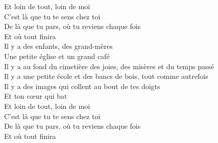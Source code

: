 \documentclass{novel}
\begin{document}
{\begin{minipage}[b][0.55\textheight][t]{\textwidth}
Et loin de tout, loin de moi \\
C'est là que tu te sens chez toi \\
De là que tu pars, où tu reviens chaque fois \\
Et où tout finira \\

Il y a des enfants, des grand-mères \\
Une petite église et un grand café \\
Il y a au fond du cimetière des joies, des misères et du temps passé \\
Il y a une petite école et des bancs de bois, tout comme autrefois \\
Il y a des images qui collent au bout de tes doigts \\
Et ton cœur qui bat \\

Et loin de tout, loin de moi \\
C'est là que tu te sens chez toi \\
De là que tu pars, où tu reviens chaque fois \\
Et où tout finira \\
\end{minipage}
}

\newpage
\normalsize
\end{document}
